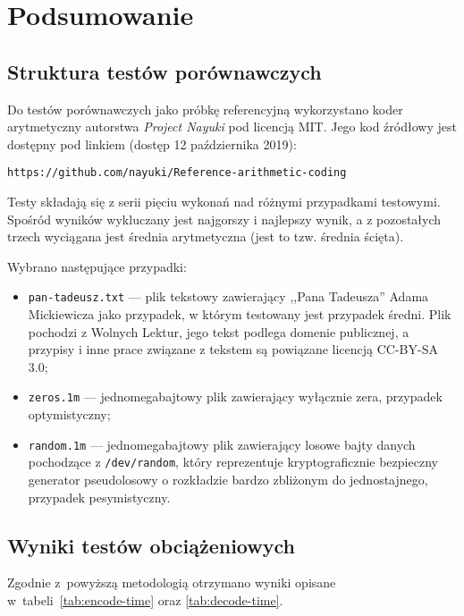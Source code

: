 \documentclass[../../thesis.tex]{subfiles}
\begin{document}
\chapter{Podsumowanie}

\section{Struktura testów porównawczych}

Do testów porównawczych jako próbkę referencyjną
wykorzystano koder arytmetyczny autorstwa \emph{Project Nayuki}
pod licencją MIT. Jego kod źródłowy jest dostępny pod linkiem (dostęp
12 października 2019):

\begin{center}
\verb|https://github.com/nayuki/Reference-arithmetic-coding|
\end{center}

Testy składają się z serii pięciu wykonań nad różnymi przypadkami
testowymi. Spośród wyników wykluczany jest najgorszy i najlepszy
wynik, a z pozostałych trzech wyciągana jest średnia arytmetyczna
(jest to tzw. średnia ścięta).

Wybrano następujące przypadki:
\begin{itemize}
  \item \texttt{pan-tadeusz.txt} --- plik tekstowy zawierający
    ,,Pana Tadeusza'' Adama Mickiewicza jako przypadek, w którym
    testowany jest przypadek średni. Plik pochodzi z Wolnych Lektur,
    jego tekst podlega domenie publicznej, a przypisy i inne
    prace związane z tekstem są powiązane licencją CC-BY-SA 3.0;
  \item \texttt{zeros.1m} --- jednomegabajtowy plik zawierający
    wyłącznie zera, przypadek optymistyczny;
  \item \texttt{random.1m} --- jednomegabajtowy plik zawierający 
    losowe bajty danych pochodzące z \texttt{/dev/random}, który
    reprezentuje kryptograficznie bezpieczny generator pseudolosowy
    o rozkładzie bardzo zbliżonym do jednostajnego, przypadek
    pesymistyczny.
\end{itemize}

\section{Wyniki testów obciążeniowych}

Zgodnie z~powyższą metodologią otrzymano wyniki opisane 
w~tabeli~\ref{tab:encode-time} oraz \ref{tab:decode-time}.
\end{document}
